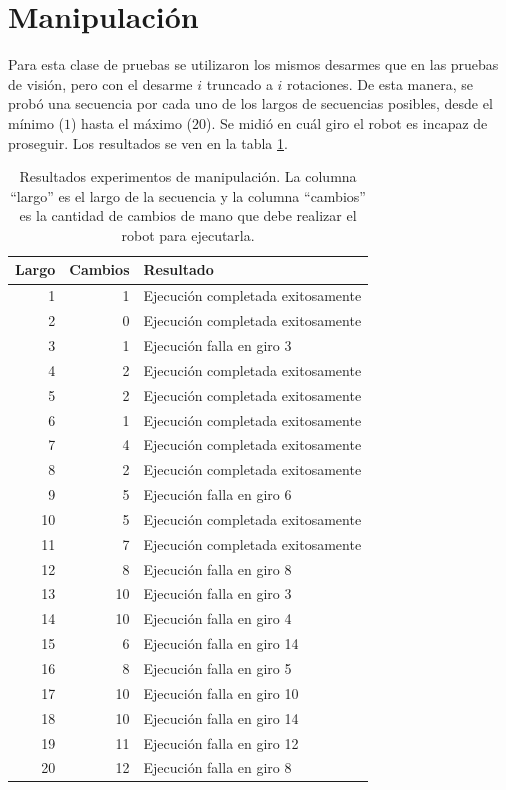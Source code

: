 \section{Manipulación}
Para esta clase de pruebas se utilizaron los mismos desarmes que en las pruebas de visión, pero con el desarme $i$ truncado a $i$ rotaciones. De esta manera, se probó una secuencia por cada uno de los largos de secuencias posibles, desde el mínimo ($1$) hasta el máximo ($20$). Se midió en cuál giro el robot es incapaz de proseguir. Los resultados se ven en la tabla \ref{resultadogiros}.

\begin{table}[h!]
	\centering
	\begin{tabular}{|r|r|l|}
		\hline
		Largo & Cambios & Resultado \\ \hline \hline
		 1 & 1 & Ejecución completada exitosamente \\ \hline
		 2 & 0 & Ejecución completada exitosamente \\ \hline
		 3 & 1 & Ejecución falla en giro 3 \\ \hline
		 4 & 2 & Ejecución completada exitosamente \\ \hline
		 5 & 2 & Ejecución completada exitosamente \\ \hline
		 6 & 1 & Ejecución completada exitosamente \\ \hline
		 7 & 4 & Ejecución completada exitosamente \\ \hline
		 8 & 2 & Ejecución completada exitosamente \\ \hline
		 9 & 5 & Ejecución falla en giro 6 \\ \hline
		10 & 5 & Ejecución completada exitosamente \\ \hline
		11 & 7 & Ejecución completada exitosamente \\ \hline
		12 & 8 & Ejecución falla en giro 8 \\ \hline
		13 & 10 & Ejecución falla en giro 3 \\ \hline
		14 & 10 & Ejecución falla en giro 4 \\ \hline
		15 & 6 & Ejecución falla en giro 14 \\ \hline
		16 & 8 & Ejecución falla en giro 5 \\ \hline
		17 & 10 & Ejecución falla en giro 10 \\ \hline
		18 & 10 & Ejecución falla en giro 14 \\ \hline
		19 & 11 & Ejecución falla en giro 12 \\ \hline
		20 & 12 & Ejecución falla en giro 8 \\ \hline
	\end{tabular}
	\caption{Resultados experimentos de manipulación. La columna ``largo'' es el largo de la secuencia y la columna ``cambios'' es la cantidad de cambios de mano que debe realizar el robot para ejecutarla.}
	\label{resultadogiros}
\end{table}

